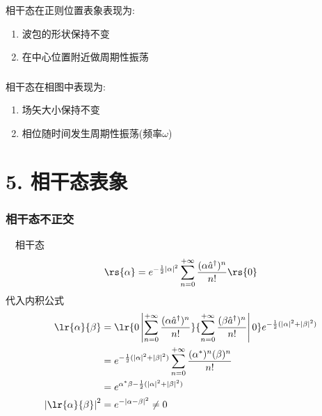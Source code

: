 \begin{frame} 
    \frametitle{}
        \begin{center}
        \end{center} 
    相干态在正则位置表象表现为: 
    \begin{enumerate}
      \item 波包的形状保持不变
      \item 在中心位置附近做周期性振荡
    \end{enumerate}  
    \end{frame}

\begin{frame}
 \frametitle{}
    \begin{center}
    \end{center}
    相干态在相图中表现为:
 \begin{enumerate}
     \item 场矢大小保持不变
     \item 相位随时间发生周期性振荡(频率$\omega$)
 \end{enumerate}
\end{frame}

\section{5. 相干态表象}

\begin{frame}
    \frametitle{相干态不正交}
        \例[12.试证明相干态不具正交性]{}
        \证 ~ 相干态
        \[\rs{\alpha}=e^{-\frac{1}{2}\left|\alpha\right|^2}  \sum_{n=0} ^{+\infty}  \frac{(\alpha\hat{a}^\dagger)^n}{n!}\rs{0} \] 
    代入内积公式
    \[ \begin{aligned}
     \lr{\alpha}{\beta} &= \lr{0\left|\sum_{n=0} ^{+\infty}\frac{(\alpha\hat{a}^\dagger)^n}{n!}}{\sum_{n=0} ^{+\infty}\frac{(\beta\hat{a}^\dagger)^n}{n!}\right|0} e^{-\frac{1}{2}(\left|\alpha\right|^2 +\left|\beta\right|^2)}\\ 
     &= e^{-\frac{1}{2}(\left|\alpha\right|^2 +\left|\beta\right|^2)} \sum_{n=0} ^{+\infty}\frac{(\alpha^*)^n (\beta)^n}{n!} \\ 
     &= e^{\alpha^* \beta -\frac{1}{2}(\left|\alpha\right|^2 +\left|\beta\right|^2)} \\ 
     \left|\lr{\alpha}{\beta} \right|^2 &= e^{-  \left| \alpha - \beta\right|^2} \not = 0 
    \end{aligned}\]
\end{frame}

